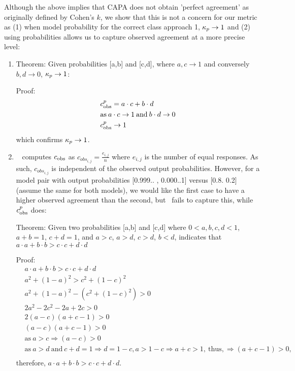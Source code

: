 Although the above implies that CAPA does not obtain 'perfect agreement' as originally defined by Cohen's $k$, we show that this is not a concern for our metric as (1) when model probability for the correct class approach 1, $\kappa_{p} \rightarrow 1$ and (2) using probabilities allows us to capture observed agreement at a more precise level:
\begin{enumerate}
    \item  Theorem:
    Given probabilities [a,b] and [c,d], where $a,c \rightarrow 1$ and conversely $b,d \rightarrow 0$, $\kappa_{p} \rightarrow 1$:
    
    Proof:
    \begin{align*}
        & c_{\text{obs}}^{p} = a\cdot c + b \cdot d \\
        & \text{as} \: a \cdot c \rightarrow 1 \: \text{and} \:  b \cdot d \rightarrow 0 \\
        & c_{\text{obs}}^{p} \rightarrow 1 
    \end{align*}
    which confirms $\kappa_{p} \rightarrow 1$. 

    \item~\citet{geirhos2020beyond} computes $c_{\text{obs}}$ as $c_{obs_{i,j}} = \frac{e_{i,j}}{n}$ where $e_{i,j}$ is the number of equal responses. As such, $c_{obs_{i,j}}$ is independent of the observed output probabilities. However, for a model pair with output probabilities [0.999.. , 0.000..1] versus [0.8. 0.2] (assume the same for both models), we would like the first case to have a higher observed agreement than the second, but~\citet{geirhos2020beyond} fails to capture this, while $c_{\text{obs}}^{p}$ does:
    
    Theorem:
    Given two probabilities [a,b] and [c,d] where $0 < a,b,c,d < 1$, $a+b=1$, $c+d=1$, and $a>c$, $a>d$, $c>d$, $b<d$, indicates that $a \cdot a + b \cdot b > c \cdot c + d \cdot d$

    Proof:
    \begin{align*}
        & a \cdot a + b \cdot b > c \cdot c + d \cdot d \\
        & a^2 + (1-a)^2 > c^2 + (1-c)^2 \\
        &  a^2 + (1-a)^2 - (c^2 + (1-c)^2) > 0 \\
        & 2a^2 - 2c^2 -2a + 2c > 0 \\
        & 2(a-c)(a+c-1) >0 \\
        & (a-c)(a+c-1) >0 \\
        & \text{as} \: a>c \Rightarrow (a-c)>0 \\
        & \text{as} \: a>d \: \text{and} \: c+d=1 \Rightarrow d=1-c, a>1-c \Rightarrow a+c>1, \: \text{thus}, \Rightarrow (a+c-1)>0, \\
    \end{align*}
    therefore, $a \cdot a + b \cdot b > c \cdot c + d \cdot d$. 
\end{enumerate}

